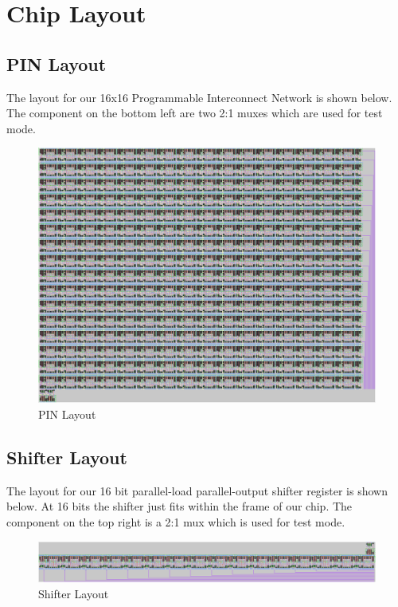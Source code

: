 \section{Chip Layout}
    \subsection{PIN Layout}
        The layout for our 16x16 Programmable Interconnect Network is shown
        below.  The component on the bottom left are two 2:1 muxes which are
        used for test mode.
        \begin{figure}[H]
            \centering
            \includegraphics[width=\linewidth]{../../magic/images/pin.png}
            \caption{PIN Layout}
        \end{figure}
    \subsection{Shifter Layout}
        The layout for our 16 bit parallel-load parallel-output shifter
        register is shown below. At 16 bits the shifter just fits within the
        frame of our chip.  The component on the top right is a 2:1 mux which
        is used for test mode.
        \begin{figure}[H]
            \centering
            \includegraphics[width=\linewidth]{../../magic/images/shift.png}
            \caption{Shifter Layout}
        \end{figure}
